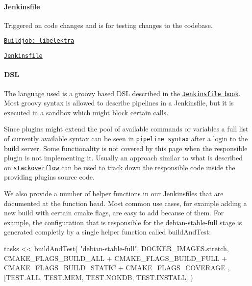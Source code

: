 \paragraph*{Jenkinsfile}


\begin{DoxyItemize}
\item Triggered on code changes and is for testing changes to the codebase.
\item \href{https://build.libelektra.org/jenkins/job/libelektra/}{\tt Buildjob\+: libelektra}
\item \href{https://master.libelektra.org/scripts/jenkins/Jenkinsfile}{\tt Jenkinsfile}
\end{DoxyItemize}

\paragraph*{D\+SL}

The language used is a groovy based D\+SL described in the \href{https://jenkins.io/doc/book/pipeline/jenkinsfile/}{\tt Jenkinsfile book}. Most groovy syntax is allowed to describe pipelines in a Jenkinsfile, but it is executed in a sandbox which might block certain calls.

Since plugins might extend the pool of available commands or variables a full list of currently available syntax can be seen in \href{https://build.libelektra.org/jenkins/job/libelektra/pipeline-syntax/}{\tt pipeline syntax} after a login to the build server. Some functionality is not covered by this page when the responsible plugin is not implementing it. Usually an approach similar to what is described on \href{https://stackoverflow.com/questions/51103359/jenkins-pipeline-return-value-of-build-step}{\tt stackoverflow} can be used to track down the responsible code inside the providing plugins source code.

We also provide a number of helper functions in our Jenkinsfiles that are documented at the function head. Most common use cases, for example adding a new build with certain cmake flags, are easy to add because of them. For example, the configuration that is responsible for the {\ttfamily debian-\/stable-\/full} stage is generated completly by a single helper function called {\ttfamily build\+And\+Test}\+:


\begin{DoxyCode}
tasks << buildAndTest(
  "debian-stable-full",
  DOCKER\_IMAGES.stretch,
  CMAKE\_FLAGS\_BUILD\_ALL +
    CMAKE\_FLAGS\_BUILD\_FULL +
    CMAKE\_FLAGS\_BUILD\_STATIC +
    CMAKE\_FLAGS\_COVERAGE
  ,
  [TEST.ALL, TEST.MEM, TEST.NOKDB, TEST.INSTALL]
)
\end{DoxyCode}


